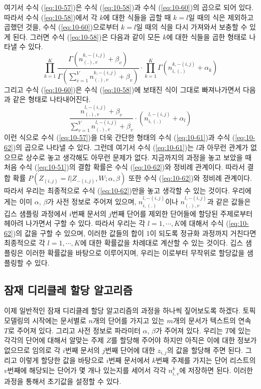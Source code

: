 \documentclass[a4paper]{oblivoir}
\begin{document}
여기서 수식 (\ref{eq:10-57})은 수식 (\ref{eq:10-58})과 수식 (\ref{eq:10-60})의 곱으로 되어 있다. 따라서 수식 (\ref{eq:10-58})에서 각 $k$에 대한 식들을 곱할 때 $k=l$일 때의 식은 제외하고 곱했던 것을, 수식 (\ref{eq:10-60})으로부터 $k=l$일 때의 식을 다시 가져와서 보충할 수 있게 된다. 그러면 수식 (\ref{eq:10-58})은 다음과 같이 모든 $k$에 대한 식들을 곱한 형태로 나타낼 수 있다.
\begin{equation}
\prod_{k=1}^{K} \frac{\Gamma(n_{(.),v}^{k,-(i,j)}+\beta_{v})}{\Gamma(\sum_{v=1}^{V} n_{(.),v}^{k,-(i,j)}+\beta_{v})} \cdot \prod_{k=1}^{K} \Gamma(n^{k,-(i,j)}_{i,(.)}+\alpha_{k})
\label{eq:10-61}
\end{equation}
그리고 수식 (\ref{eq:10-60})은 수식 (\ref{eq:10-58})에 보태진 식이 그대로 빠져나가면서 다음과 같은 형태로 나타내어진다.
\begin{equation}
\frac{n_{(.),v}^{l,-(i,j)}+\beta_{v}}{\sum_{v=1}^{V} n_{(.),v}^{l,-(i,j)}+\beta_{v}} \cdot (n^{l,-(i,j)}_{i,(.)}+\alpha_{l})
\label{eq:10-62}
\end{equation}
이런 식으로 수식 (\ref{eq:10-57})을 더욱 간단한 형태의 수식 (\ref{eq:10-61})과 수식 (\ref{eq:10-62})의 곱으로 나타낼 수 있다. 그런데 여기서 수식 (\ref{eq:10-61})는 $l$과 아무런 관계가 없으므로 상수로 놓고 생각해도 아무런 문제가 없다. 지금까지의 과정을 놓고 보았을 때 처음 수식 (\ref{eq:10-51})의 결합 확률은 수식 (\ref{eq:10-62})와 정비례 관계이다. 따라서 결합 확률 $P(Z_{(i,j)} = l|Z_{-(i,j)}, W ; \alpha,\beta)$ 또한 수식 (\ref{eq:10-62})와 정비례 관계이다. 따라서 우리는 최종적으로 수식 (\ref{eq:10-62})만을 놓고 생각할 수 있는 것이다. 우리에게는 이미 $\alpha$, $\beta$가 사전 정보로 주어져 있으며, $n^{l,-(i,j)}_{i,(.)}$이나 $n_{(.),v}^{l,-(i,j)}$과 같은 값들은 깁스 샘플링 과정에서 $i$번째 문서의 $j$번째 단어를 제외한 단어들에 할당된 주제로부터 헤아려 나가면서 구할 수 있다. 따라서 우리는 각 $l=1,\cdots,K$에 대해서 수식 (\ref{eq:10-62})의 값을 구할 수 있으며, 이러한 값들의 합이 1이 되도록 정규화 과정까지 거친다면 최종적으로 각 $l=1,\cdots,K$에 대한 확률값을 차례대로 계산할 수 있는 것이다. 깁스 샘플링은 이러한 확률값을 바탕으로 이루어지며, 우리는 이로부터 무작위로 할당값을 샘플링할 수 있다. 

\subsection{잠재 디리클레 할당 알고리즘}
 
이제 일반적인 잠재 디리클레 할당 알고리즘의 과정을 하나씩 짚어보도록 하겠다. 토픽 모델링의 시작에는 문서별로 $n$개의 단어를 가지고 있는 $m$개의 문서가 텍스트의 연속 $T$로 주어져 있다. 그리고 사전 정보로 파라미터 $\alpha$, $\beta$가 주어져 있다. 우리는 $T$에 있는 각각의 단어에 대해서 알맞는 주제 $Z$를 할당해 주어야 하지만 아직은 이에 대한 정보가 없으므로 임의로 각 $i$번째 문서의 $j$번째 단어에 대한 $z_{i,j}$의 값을 할당해 주면 된다. 그리고 이렇게 할당한 값을 바탕으로 $i$번째 문서에서 $k$번째 주제를 가지는 단어 리스트의 $v$번째에 해당되는 단어가 몇 개나 있는지를 세어서 각각 $n^{k}_{i,v}$에 저장하면 된다. 이러한 과정을 통해서 초기값을 설정할 수 있다. \\
\end{document}

